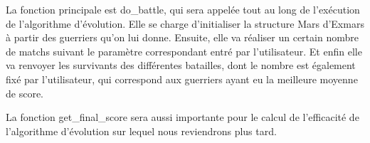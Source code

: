 \documentclass[french]{article}
\begin{document}
\begin{enumerate}
                    La fonction principale est do\_battle, qui sera appelée tout au long de l'exécution de l'algorithme d'évolution. Elle se charge d'initialiser la structure Mars d'Exmars à partir des guerriers qu'on lui donne. Ensuite, elle va réaliser un certain nombre de matchs suivant le paramètre correspondant entré par l'utilisateur. Et enfin elle va renvoyer les survivants  des différentes batailles, dont le nombre est également fixé par l'utilisateur, qui correspond aux guerriers ayant eu la meilleure moyenne de score. 
                    \bigskip
                    
                    La fonction get\_final\_score sera aussi importante pour le calcul de l'efficacité de l'algorithme d'évolution sur lequel nous reviendrons plus tard. 
                    \bigskip
                    
            \end{enumerate}
        \newpage
\end{document}
